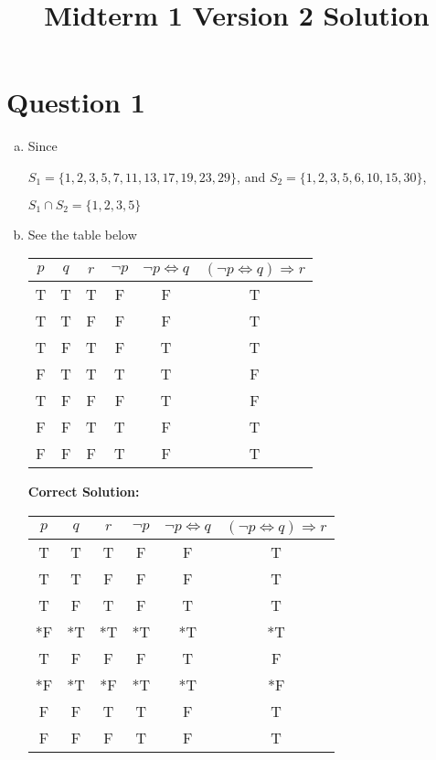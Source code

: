 \documentclass[12pt]{article}
\begin{document}
\title{Midterm 1 Version 2 Solution}
\maketitle

\section*{Question 1}
\begin{enumerate}[a.]
    \item

    Since

    $S_1 = \{1,2,3,5,7,11,13,17,19,23,29\}$, and $S_2 = \{1,2,3,5,6,10,15,30\}$,

    $S_1 \cap S_2 = \{1,2,3,5\}$

    \item

    See the table below

    \begin{tabular}{c|c|c|c|c|c}
        $p$ & $q$ & $r$ & $\neg p$ & $\neg p \Leftrightarrow q$ & $(\neg p \Leftrightarrow q) \Rightarrow r$\\
        \hline
        T & T & T & F & F & T\\
        \hline
        T & T & F & F & F & T\\
        \hline
        T & F & T & F & T & T\\
        \hline
        F & T & T & T & T & F\\
        \hline
        T & F & F & F & T & F\\
        \hline
        F & F & T & T & F & T\\
        \hline
        F & F & F & T & F & T
    \end{tabular}

    \bigskip

    \textbf{Correct Solution:}

    \begin{tabular}{c|c|c|c|c|c}
        $p$ & $q$ & $r$ & $\neg p$ & $\neg p \Leftrightarrow q$ & $(\neg p \Leftrightarrow q) \Rightarrow r$\\
        \hline
        T & T & T & F & F & T\\
        \hline
        T & T & F & F & F & T\\
        \hline
        T & F & T & F & T & T\\
        \hline
        *F & *T & *T & *T & *T & *T\\
        \hline
        T & F & F & F & T & F\\
        \hline
        *F & *T & *F & *T & *T & *F\\
        \hline
        F & F & T & T & F & T\\
        \hline
        F & F & F & T & F & T
    \end{tabular}


\end{enumerate}
\end{document}
